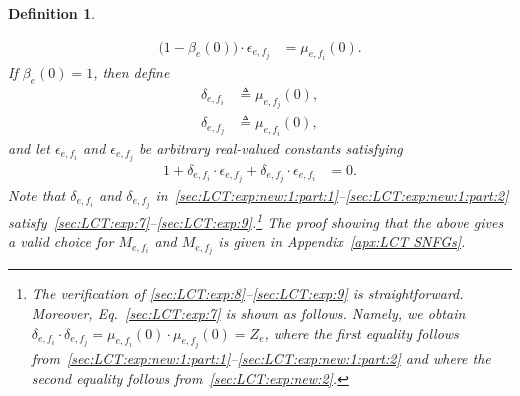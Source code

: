 \documentclass[journal]{IEEEtran}
\newcommand{\add}[1]{{\color{black}#1}}
\newtheorem{definition}[theorem]{Definition}
\newcommand{\beli}{\beta}
\newcommand{\defeq}{ \triangleq }
\newcommand{\efi}{ e,f_i }
\newcommand{\efj}{ e,f_j }
\begin{document}
\begin{definition}
\begin{enumerate}
\begin{itemize}
{\begin{align}
                      \bigl( 1 \! - \! \beli_e(0) \bigr)
                      \cdot
                      \epsilon_{\efj}
                       & = \mu_{\efi}(0).
                      \label{sec:LCT:exp:9}
                    \end{align}
                    If $ \beli_e(0) = 1 $, then define
                    \begin{align}
                      \delta_{\efi}
                       & \defeq
                      \mu_{\efj}(0),
                      \label{sec:LCT:exp:new:1:part:1} \\
                      \delta_{\efj}
                       & \defeq
                      \mu_{\efi}(0),
                      \label{sec:LCT:exp:new:1:part:2}
                    \end{align}
                    and let $\epsilon_{\efi}$ and $\epsilon_{\efj}$ be arbitrary
                    real-valued constants satisfying
                    \begin{align}
                      1
                      +
                      \delta_{\efi}
                      \cdot
                      \epsilon_{\efj}
                      +
                      \delta_{\efj}
                      \cdot
                      \epsilon_{\efi} & = 0.
                      \label{extra constraint on epsilon for beli = [x = 0]}
                    \end{align}
                    Note that $\delta_{\efi}$ and $\delta_{\efj}$
                    in~\eqref{sec:LCT:exp:new:1:part:1}--\eqref{sec:LCT:exp:new:1:part:2}
                    satisfy~\eqref{sec:LCT:exp:7}--\eqref{sec:LCT:exp:9}.\footnote{\add{The
                        verification of
                        \eqref{sec:LCT:exp:8}--\eqref{sec:LCT:exp:9} is
                        straightforward. Moreover, Eq.~\eqref{sec:LCT:exp:7} is
                        shown as follows. Namely, we obtain
                        $\delta_{\efi} \cdot \delta_{\efj} = \mu_{\efi}(0) \cdot
                          \mu_{\efj}(0) = Z_e$, where the first equality follows
                        from~\eqref{sec:LCT:exp:new:1:part:1}--\eqref{sec:LCT:exp:new:1:part:2}
                        and where the second equality follows
                        from~\eqref{sec:LCT:exp:new:2}.}} The proof showing that
                    the above gives a valid choice for $M_{\efi}$ and $M_{\efj}$
                    is given in Appendix~\ref{apx:LCT SNFGs}.}

          \end{itemize}


\end{enumerate}
\end{definition}
\end{document}
